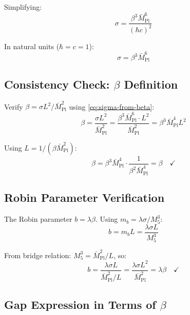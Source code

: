 \documentclass[11pt,a4paper]{article}
\begin{document}
Simplifying:
\begin{equation}
  \sigma = \frac{\beta^3 \bar{M}_{\text{Pl}}^6}{(\hbar c)^2}
  \label{eq:sigma-from-beta}
\end{equation}

In natural units ($\hbar = c = 1$):
\begin{equation}
  \sigma = \beta^3 \bar{M}_{\text{Pl}}^6
  \label{eq:sigma-natural}
\end{equation}

\subsection{Consistency Check: $\beta$ Definition}

Verify $\beta = \sigma L^2 / \bar{M}_{\text{Pl}}^2$ using \eqref{eq:sigma-from-beta}:
\begin{equation}
  \beta = \frac{\sigma L^2}{\bar{M}_{\text{Pl}}^2}
        = \frac{\beta^3 \bar{M}_{\text{Pl}}^6 \cdot L^2}{\bar{M}_{\text{Pl}}^2}
        = \beta^3 \bar{M}_{\text{Pl}}^4 L^2
  \label{eq:beta-check-1}
\end{equation}

Using $L = 1/(\beta \bar{M}_{\text{Pl}}^2)$:
\begin{equation}
  \beta = \beta^3 \bar{M}_{\text{Pl}}^4 \cdot \frac{1}{\beta^2 \bar{M}_{\text{Pl}}^4}
        = \beta \quad \checkmark
  \label{eq:beta-check-2}
\end{equation}

\subsection{Robin Parameter Verification}

The Robin parameter $b = \lambda \beta$. Using $m_b = \lambda \sigma / M_5^3$:
\begin{equation}
  b = m_b L = \frac{\lambda \sigma L}{M_5^3}
  \label{eq:b-verify-1}
\end{equation}

From bridge relation: $M_5^3 = \bar{M}_{\text{Pl}}^2 / L$, so:
\begin{equation}
  b = \frac{\lambda \sigma L}{\bar{M}_{\text{Pl}}^2 / L}
    = \frac{\lambda \sigma L^2}{\bar{M}_{\text{Pl}}^2}
    = \lambda \beta \quad \checkmark
  \label{eq:b-verify-2}
\end{equation}

\subsection{Gap Expression in Terms of $\beta$}
\end{document}
